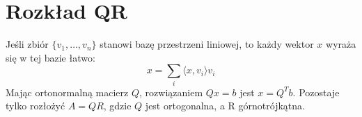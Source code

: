 \section{Rozkład QR}
Jeśli zbiór \( \{v_1, \dots, v_n\} \) stanowi bazę przestrzeni liniowej, to każdy wektor \( x \) wyraża się w tej bazie łatwo:
\[
	x = \sum_{i} \langle x, v_i \rangle v_i
\]
Mając ortonormalną macierz \( Q \), rozwiązaniem \( Qx = b \) jest \( x = Q^T b \). Pozostaje tylko rozłożyć \( A = QR \), gdzie \( Q \) jest ortogonalna, a R górnotrójkątna.